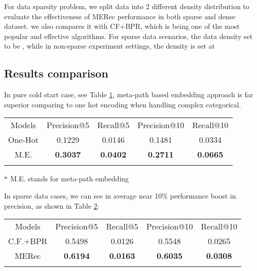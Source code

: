 For data sparsity problem, we split data into 2 different density distribution to evaluate the effectiveness of MERec performance in both sparse and dense dataset. we also compares it with CF+BPR, which is being one of the most popular and effective algorithms. For sparse data scenarios, the data density set to be , while in non-sparse experiment settings, the density is set at 


\subsection{Results comparison}
In pure cold start case, see Table \ref{tbl1}, meta-path based embedding approach is far superior comparing to one hot encoding when handling complex categorical.

\begin{table}
    {\begin{tabular}{@{}ccccc@{}}\toprule
    Models & Precision@5 & Recall@5 & Precision@10 & Recall@10 \\
    \colrule
    One-Hot\hphantom{00} & \hphantom{0} 0.1229 & \hphantom{0} 0.0146 & 0.1481 & 0.0334 \\
    M.E.\hphantom{00} & \hphantom{0} \textbf{0.3037} & \hphantom{0} \textbf{0.0402} & \textbf{0.2711} & \textbf{0.0665} \\
    
    \botrule
    \end{tabular}
    }
    \begin{tabnote}
    $^{\text a}$ M.E. stands for meta-path embedding\\
    \end{tabnote}
    \label{tbl1}
    \end{table}



In sparse data cases, we can see in average near 10\% performance boost in precision, as shown in Table \ref{tbl2}:

\begin{table}
    {\begin{tabular}{@{}ccccc@{}}\toprule
    Models & Precision@5 & Recall@5 & Precision@10 & Recall@10 \\
    \colrule
    C.F.+BPR\hphantom{00} & \hphantom{0} 0.5498 & 0.0126 & 0.5548 & 0.0265 \\
    MERec\hphantom{00} & \hphantom{0} \textbf{0.6194} & \textbf{0.0163} & \textbf{0.6035} & \textbf{0.0308} \\
    
    \botrule
    \end{tabular}
    }
    \label{tbl2}
\end{table}


